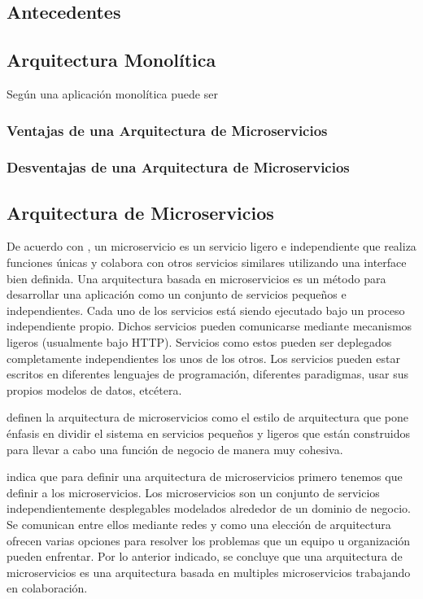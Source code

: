 
\subsection{Antecedentes}

\subsection{Arquitectura Monolítica}

Según \cite{dmitry2014micro} una aplicación monolítica puede ser

\subsubsection{Ventajas de una Arquitectura de Microservicios}
\subsubsection{Desventajas de una Arquitectura de Microservicios}

\subsection{Arquitectura de Microservicios}

De acuerdo con \cite{dmitry2014micro}, un microservicio es un servicio ligero e independiente que
realiza funciones únicas y colabora con otros servicios similares utilizando una interface bien definida.
Una arquitectura basada en microservicios es un método para desarrollar una aplicación como un conjunto
de servicios pequeños e independientes. Cada uno de los servicios está siendo ejecutado bajo un
proceso independiente propio. Dichos servicios pueden comunicarse mediante mecanismos ligeros (usualmente
bajo HTTP). Servicios como estos pueden ser deplegados completamente independientes los unos de los otros.
Los servicios pueden estar escritos en diferentes lenguajes de programación, diferentes paradigmas,
usar sus propios modelos de datos, etcétera.

\cite{alshuqayran2016systematic} definen la arquitectura de microservicios como el estilo de arquitectura
que pone énfasis en dividir el sistema en servicios pequeños y ligeros que están construidos para
llevar a cabo una función de negocio de manera muy cohesiva.

\cite{newman2019monolith} indica que para definir una arquitectura de microservicios primero tenemos que
definir a los microservicios. Los microservicios son un conjunto de servicios independientemente
desplegables modelados alrededor de un dominio de negocio. Se comunican entre ellos mediante redes
y como una elección de arquitectura ofrecen varias opciones para resolver los problemas que un
equipo u organización pueden enfrentar. Por lo anterior indicado, se concluye que una arquitectura
de microservicios es una arquitectura basada en multiples microservicios trabajando en colaboración.

